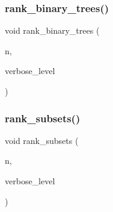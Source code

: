 \mbox{\label{rank__anything_8_c_a80b566d83b03cf874471b0a4d26626e2}} 
\subsubsection{\texorpdfstring{rank\+\_\+binary\+\_\+trees()}{rank\_binary\_trees()}}
{\footnotesize\ttfamily void rank\+\_\+binary\+\_\+trees (\begin{DoxyParamCaption}\item[{\mbox{\hyperlink{galois_8h_a09fddde158a3a20bd2dcadb609de11dc}{I\+NT}}}]{n,  }\item[{\mbox{\hyperlink{galois_8h_a09fddde158a3a20bd2dcadb609de11dc}{I\+NT}}}]{verbose\+\_\+level }\end{DoxyParamCaption})}

\mbox{\label{rank__anything_8_c_a86230af3031e0c6e6075674d14788942}} 
\subsubsection{\texorpdfstring{rank\+\_\+subsets()}{rank\_subsets()}}
{\footnotesize\ttfamily void rank\+\_\+subsets (\begin{DoxyParamCaption}\item[{\mbox{\hyperlink{galois_8h_a09fddde158a3a20bd2dcadb609de11dc}{I\+NT}}}]{n,  }\item[{\mbox{\hyperlink{galois_8h_a09fddde158a3a20bd2dcadb609de11dc}{I\+NT}}}]{verbose\+\_\+level }\end{DoxyParamCaption})}


